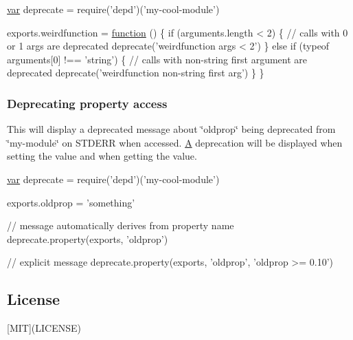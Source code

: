 \begin{DoxyCode}
\hyperlink{018__def_8c_a335628f2e9085305224b4f9cc6e95ed5}{var} deprecate = require(\textcolor{stringliteral}{'depd'})(\textcolor{stringliteral}{'my-cool-module'})

exports.weirdfunction = \hyperlink{class_test_a51a683fa4fcec142ab1574e00a7b6860}{function} () \{
  \textcolor{keywordflow}{if} (arguments.length < 2) \{
    \textcolor{comment}{// calls with 0 or 1 args are deprecated}
    deprecate(\textcolor{stringliteral}{'weirdfunction args < 2'})
  \} \textcolor{keywordflow}{else} \textcolor{keywordflow}{if} (typeof arguments[0] !== \textcolor{stringliteral}{'string'}) \{
    \textcolor{comment}{// calls with non-string first argument are deprecated}
    deprecate(\textcolor{stringliteral}{'weirdfunction non-string first arg'})
  \}
\}
\end{DoxyCode}


\subsubsection*{Deprecating property access}

This will display a deprecated message about \char`\"{}oldprop\char`\"{} being deprecated from \char`\"{}my-\/module\char`\"{} on S\+T\+D\+E\+R\+R when accessed. \hyperlink{class_a}{A} deprecation will be displayed when setting the value and when getting the value.


\begin{DoxyCode}
\hyperlink{018__def_8c_a335628f2e9085305224b4f9cc6e95ed5}{var} deprecate = require(\textcolor{stringliteral}{'depd'})(\textcolor{stringliteral}{'my-cool-module'})

exports.oldprop = \textcolor{stringliteral}{'something'}

\textcolor{comment}{// message automatically derives from property name}
deprecate.property(exports, \textcolor{stringliteral}{'oldprop'})

\textcolor{comment}{// explicit message}
deprecate.property(exports, \textcolor{stringliteral}{'oldprop'}, \textcolor{stringliteral}{'oldprop >= 0.10'})
\end{DoxyCode}


\subsection*{License}

\mbox{[}M\+I\+T\mbox{]}(L\+I\+C\+E\+N\+S\+E) 